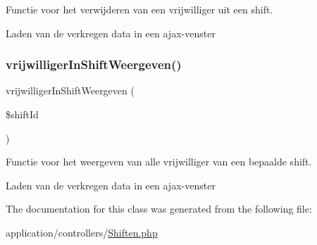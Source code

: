 Functie voor het verwijderen van een vrijwilliger uit een shift. 

Laden van de verkregen data in een ajax-\/venster \mbox{\label{class_shiften_acc7f0b07717791306d83399416669ef9}} 
\subsubsection{\texorpdfstring{vrijwilliger\+In\+Shift\+Weergeven()}{vrijwilligerInShiftWeergeven()}}
{\footnotesize\ttfamily vrijwilliger\+In\+Shift\+Weergeven (\begin{DoxyParamCaption}\item[{}]{\$shift\+Id }\end{DoxyParamCaption})}



Functie voor het weergeven van alle vrijwilliger van een bepaalde shift. 

Laden van de verkregen data in een ajax-\/venster 

The documentation for this class was generated from the following file\+:\begin{DoxyCompactItemize}
\item 
application/controllers/\mbox{\hyperlink{_shiften_8php}{Shiften.\+php}}\end{DoxyCompactItemize}
